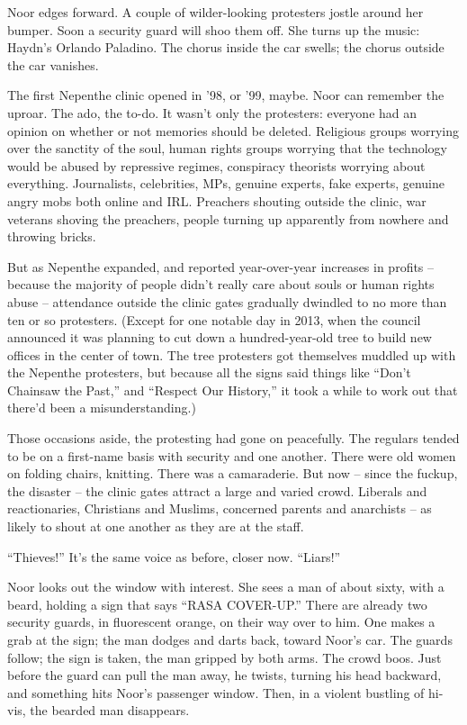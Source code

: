 \documentclass[12pt,a5paper]{book}
\newcommand{\qm}[1]{“#1”}
\begin{document}
Noor edges forward. A couple of wilder-looking protesters jostle around her bumper. Soon a security guard will shoo them off. She turns up the music: Haydn's Orlando Paladino. The chorus inside the car swells; the chorus outside the car vanishes.

The first Nepenthe clinic opened in ’98, or ’99, maybe. Noor can remember the uproar. The ado, the to-do. It wasn't only the protesters: everyone had an opinion on whether or not memories should be deleted. Religious groups worrying over the sanctity of the soul, human rights groups worrying that the technology would be abused by repressive regimes, conspiracy theorists worrying about everything. Journalists, celebrities, MPs, genuine experts, fake experts, genuine angry mobs both online and IRL. Preachers shouting outside the clinic, war veterans shoving the preachers, people turning up apparently from nowhere and throwing bricks.

But as Nepenthe expanded, and reported year-over-year increases in profits – because the majority of people didn't really care about souls or human rights abuse – attendance outside the clinic gates gradually dwindled to no more than ten or so protesters. (Except for one notable day in 2013, when the council announced it was planning to cut down a hundred-year-old tree to build new offices in the center of town. The tree protesters got themselves muddled up with the Nepenthe protesters, but because all the signs said things like \qm{Don't Chainsaw the Past,} and \qm{Respect Our History,} it took a while to work out that there'd been a misunderstanding.)

Those occasions aside, the protesting had gone on peacefully. The regulars tended to be on a first-name basis with security and one another. There were old women on folding chairs, knitting. There was a camaraderie. But now – since the fuckup, the disaster – the clinic gates attract a large and varied crowd. Liberals and reactionaries, Christians and Muslims, concerned parents and anarchists – as likely to shout at one another as they are at the staff.

\qm{Thieves!} It's the same voice as before, closer now. \qm{Liars!}

Noor looks out the window with interest. She sees a man of about sixty, with a beard, holding a sign that says \qm{RASA COVER-UP.} There are already two security guards, in fluorescent orange, on their way over to him. One makes a grab at the sign; the man dodges and darts back, toward Noor's car. The guards follow; the sign is taken, the man gripped by both arms. The crowd boos. Just before the guard can pull the man away, he twists, turning his head backward, and something hits Noor's passenger window. Then, in a violent bustling of hi-vis, the bearded man disappears.
\end{document}
